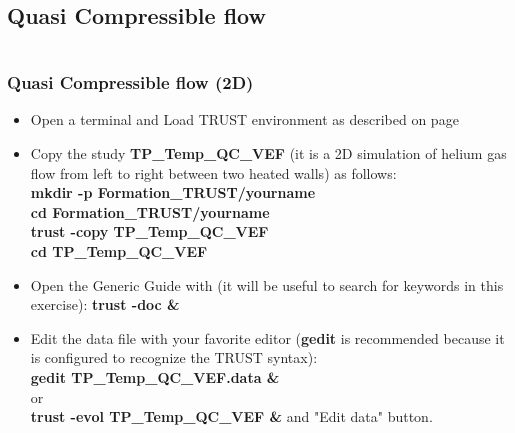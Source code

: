 \documentclass[10pt, hyperref={unicode=true,pdfusetitle, bookmarks=true,bookmarksnumbered=false,bookmarksopen=false, breaklinks=false,pdfborder={0 0l 1},backref=true,colorlinks=true,linkcolor=darkblue,pageanchor}]{beamer}
\begin{document}
\subsection{Quasi Compressible flow}
\begin{frame}
\begin{small}
\begin{columns}[c] 
\tableofcontents[sections={1-8},currentsection, currentsubsection]
\tableofcontents[sections={9-16},currentsection, currentsubsection]
\end{columns}
\end{small}
\end{frame}
\begin{frame}
\frametitle{Quasi Compressible flow (2D)}
\begin{block}{}


\begin{itemize}
\item Open a terminal and Load TRUST environment as described on page \pageref{init_trust}
\item Copy the study \textbf{TP\_Temp\_QC\_VEF} (it is a 2D simulation of helium gas flow from left to right between two heated walls) as follows:\\
\textbf{mkdir -p Formation\_TRUST/yourname}\\
\textbf{cd Formation\_TRUST/yourname}\\
\textbf{trust -copy TP\_Temp\_QC\_VEF}\\
\textbf{cd TP\_Temp\_QC\_VEF}

\item Open the Generic Guide with (it will be useful to search for keywords in this exercise): \textbf{trust -doc \&}

\item Edit the data file with your favorite editor (\textbf{gedit} is recommended because it is configured to recognize the TRUST syntax):\\
\textbf{gedit TP\_Temp\_QC\_VEF.data \&} \\
or \\
\textbf{trust -evol TP\_Temp\_QC\_VEF  \&} and "Edit data" button.
\end{itemize}

\end{block}
\end{frame}
\end{document}
